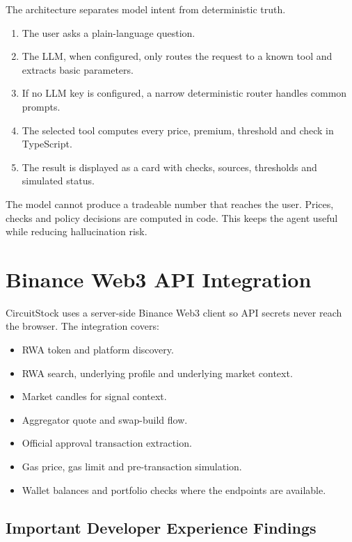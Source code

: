 \documentclass[11pt,a4paper]{article}
\begin{document}
The architecture separates model intent from deterministic truth.

\begin{enumerate}
  \item The user asks a plain-language question.
  \item The LLM, when configured, only routes the request to a known tool and extracts basic parameters.
  \item If no LLM key is configured, a narrow deterministic router handles common prompts.
  \item The selected tool computes every price, premium, threshold and check in TypeScript.
  \item The result is displayed as a card with checks, sources, thresholds and simulated status.
\end{enumerate}

The model cannot produce a tradeable number that reaches the user. Prices, checks and policy decisions are computed in code. This keeps the agent useful while reducing hallucination risk.

\section{Binance Web3 API Integration}

CircuitStock uses a server-side Binance Web3 client so API secrets never reach the browser. The integration covers:

\begin{itemize}
  \item RWA token and platform discovery.
  \item RWA search, underlying profile and underlying market context.
  \item Market candles for signal context.
  \item Aggregator quote and swap-build flow.
  \item Official approval transaction extraction.
  \item Gas price, gas limit and pre-transaction simulation.
  \item Wallet balances and portfolio checks where the endpoints are available.
\end{itemize}

\subsection{Important Developer Experience Findings}
\end{document}
